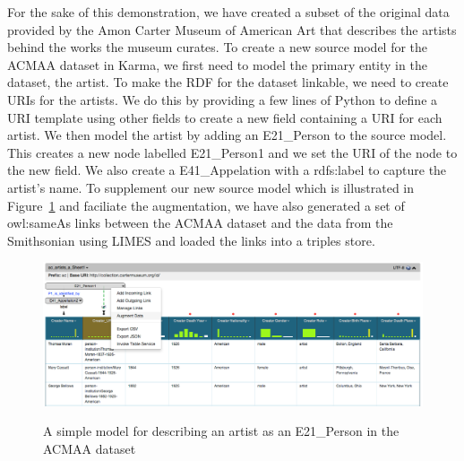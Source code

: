 For the sake of this demonstration, we have created a subset of the original data provided by the Amon Carter Museum of American Art that describes the artists behind the works the museum curates.  
To create a new source model for the ACMAA dataset in Karma, we first need to model the primary entity in the dataset, the artist.  To make the RDF for the dataset linkable, we need to create URIs for the artists.  
We do this by providing a few lines of Python to define a URI template using other fields to create a new field containing a URI for each artist.  We then model the artist by adding an E21\_Person to the source model.  
This creates a new node labelled E21\_Person1 and we set the URI of the node to the new field.  
We also create a E41\_Appelation with a rdfs:label to capture the artist's name.  
To supplement our new source model which is illustrated in Figure~\ref{fig:simple-model-screenshot} and faciliate the augmentation, we have also generated a set of owl:sameAs links between the ACMAA dataset and the data from the Smithsonian using LIMES and loaded the links into a triples store.  


\begin{figure}
\begin{center}
\includegraphics[width=4.8in]{images/4-simple-model.png}
\vspace{-3mm}
\caption{A simple model for describing an artist as an E21\_Person in the ACMAA dataset}
\vspace{-2mm}
\label{fig:simple-model-screenshot}
\end{center}
\vspace{-1.5em}
\end{figure}


